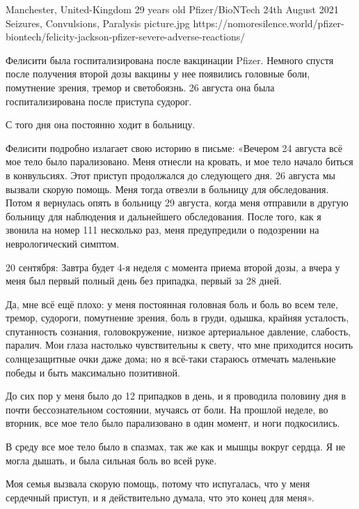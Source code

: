 {Manchester, United-Kingdom}
{29 years old}
{Pfizer/BioNTech}
{24th August 2021}
{Seizures, Convulsions, Paralysis}
{picture.jpg}
{https://nomoresilence.world/pfizer-biontech/felicity-jackson-pfizer-severe-adverse-reactions/}
{

Фелисити была госпитализирована после вакцинации Pfizer. Немного спустя после
получения второй дозы вакцины у нее появились головные боли, помутнение зрения,
тремор и светобоязнь. 26 августа она была госпитализирована после приступа
судорог.

С того дня она постоянно ходит в больницу.

Фелисити подробно излагает свою историю в письме: «Вечером 24 августа всё мое
тело было парализовано. Меня отнесли на кровать, и мое тело начало биться в
конвульсиях. Этот приступ продолжался до следующего дня. 26 августа мы вызвали
скорую помощь. Меня тогда отвезли в больницу для обследования. Потом я вернулась
опять в больницу 29 августа, когда меня отправили в другую больницу для
наблюдения и дальнейшего обследования. После того, как я звонила на номер 111
несколько раз, меня предупредили о подозрении на неврологический симптом.

20 сентября: Завтра будет 4-я неделя с момента приема второй дозы, а вчера у
меня был первый полный день без припадка, первый за 28 дней.

Да, мне всё ещё плохо: у меня постоянная головная боль и боль во всем теле,
тремор, судороги, помутнение зрения, боль в груди, одышка, крайняя усталость,
спутанность сознания, головокружение, низкое артериальное давление, слабость,
паралич. Мои глаза настолько чувствительны к свету, что мне приходится носить
солнцезащитные очки даже дома; но я всё-таки стараюсь отмечать маленькие победы
и быть максимально позитивной.

До сих пор у меня было до 12 припадков в день, и я проводила половину дня в
почти бессознательном состоянии, мучаясь от боли. На прошлой неделе, во вторник,
все мое тело было парализовано в один момент, и ноги подкосились.

В среду все мое тело было в спазмах, так же как и мышцы вокруг сердца. Я не
могла дышать, и была сильная боль во всей руке.

Моя семья вызвала скорую помощь, потому что испугалась, что у меня сердечный
приступ, и я действительно думала, что это конец для меня».

}
